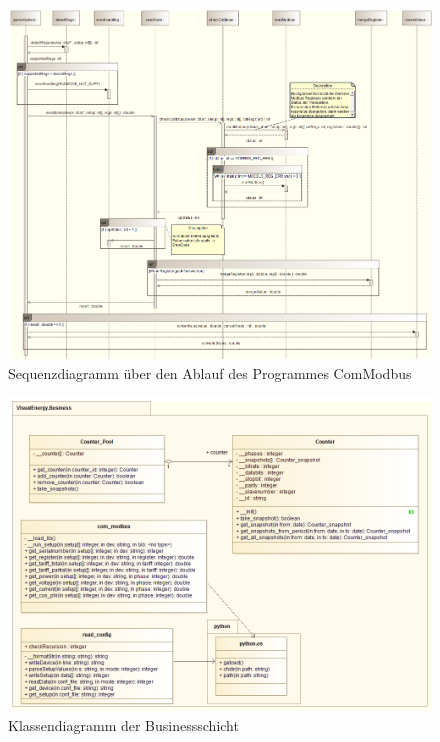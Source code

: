 \documentclass[Bachelorarbeit.tex]{subfiles}
\begin{document}
\begin{figure}

\centering
\includegraphics[angle=90,width=1.2\linewidth]{./img/Sequenzdiagramm_ComModbus1}
\caption{Sequenzdiagramm über den Ablauf des Programmes ComModbus}
\label{pic:sequenzdiagramm_comModbus}
\end{figure}
\newpage

\begin{figure}
\centering
\includegraphics[width=0.9\linewidth]{./img/Klassendiagramm_Business}
\caption{Klassendiagramm der Businessschicht}
\label{pic:klassendiagramm_business}
\end{figure}
\newpage
\end{document}
